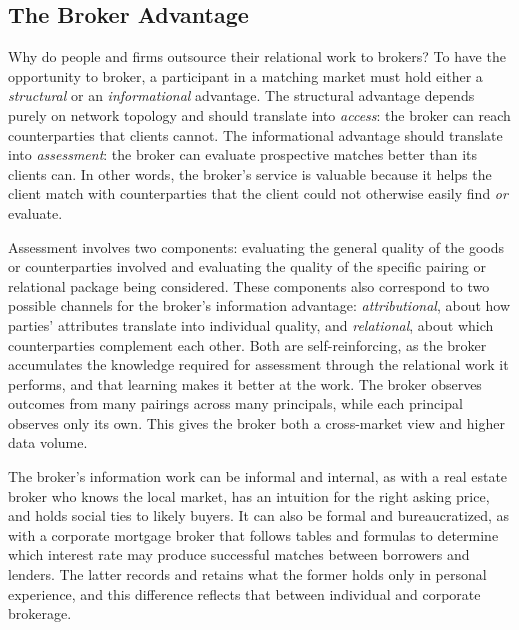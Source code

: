 \documentclass[
]{article}
\begin{document}
\subsection{The Broker Advantage}

Why do people and firms outsource their relational work to brokers? To have the opportunity to broker, a participant in a matching market must hold either a \emph{structural} or an \emph{informational} advantage. The structural advantage depends purely on network topology and should translate into \emph{access}: the broker can reach counterparties that clients cannot. The informational advantage should translate into \emph{assessment}: the broker can evaluate prospective matches better than its clients can. In other words, the broker's service is valuable because it helps the client match with counterparties that the client could not otherwise easily find \emph{or} evaluate.

Assessment involves two components: evaluating the general quality of the goods or counterparties involved and evaluating the quality of the specific pairing or relational package being considered. These components also correspond to two possible channels for the broker's information advantage: \emph{attributional}, about how parties' attributes translate into individual quality, and \emph{relational}, about which counterparties complement each other. Both are self-reinforcing, as the broker accumulates the knowledge required for assessment through the relational work it performs, and that learning makes it better at the work. The broker observes outcomes from many pairings across many principals, while each principal observes only its own. This gives the broker both a cross-market view and higher data volume.

The broker's information work can be informal and internal, as with a real estate broker who knows the local market, has an intuition for the right asking price, and holds social ties to likely buyers. It can also be formal and bureaucratized, as with a corporate mortgage broker that follows tables and formulas to determine which interest rate may produce successful matches between borrowers and lenders. The latter records and retains what the former holds only in personal experience, and this difference reflects that between individual and corporate brokerage.
\end{document}
